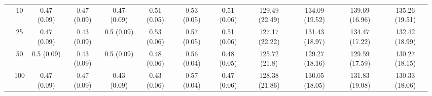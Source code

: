 \documentclass[11pt]{article}
\theoremstyle{definition}
\begin{document}
\begin{landscape}
\begin{table}[b]
\begin{center}
{\begin{tabular}{cc|ccc|ccc|cccc|}
    & 10  & 0.47 (0.09) & 0.47 (0.09) & 0.47 (0.09) & 0.51 (0.05) & 0.53 (0.05) & 0.51 (0.06) & 129.49 (22.49) & 134.09 (19.52) & 139.69 (16.96) & 135.26 (19.51) \\ 
    & 25  & 0.47 (0.09) & 0.43 (0.09) & 0.5 (0.09) & 0.53 (0.06) & 0.57 (0.05) & 0.51 (0.06) & 127.17 (22.22) & 131.43 (18.97) & 134.47 (17.22) & 132.42 (18.99) \\ 
    & 50  & 0.5 (0.09) & 0.43 (0.09) & 0.5 (0.09) & 0.48 (0.06) & 0.56 (0.04) & 0.48 (0.05) & 125.72 (21.8) & 129.27 (18.16) & 129.59 (17.59) & 130.27 (18.15) \\ 
    & 100  & 0.47 (0.09) & 0.47 (0.09) & 0.43 (0.09) & 0.43 (0.06) & 0.57 (0.04) & 0.47 (0.06) & 128.38 (21.86) & 130.05 (18.05) & 131.83 (19.08) & 130.33 (18.06) \\
\end{tabular}}
   \end{center}
\end{table}
\end{landscape}
\end{document}
